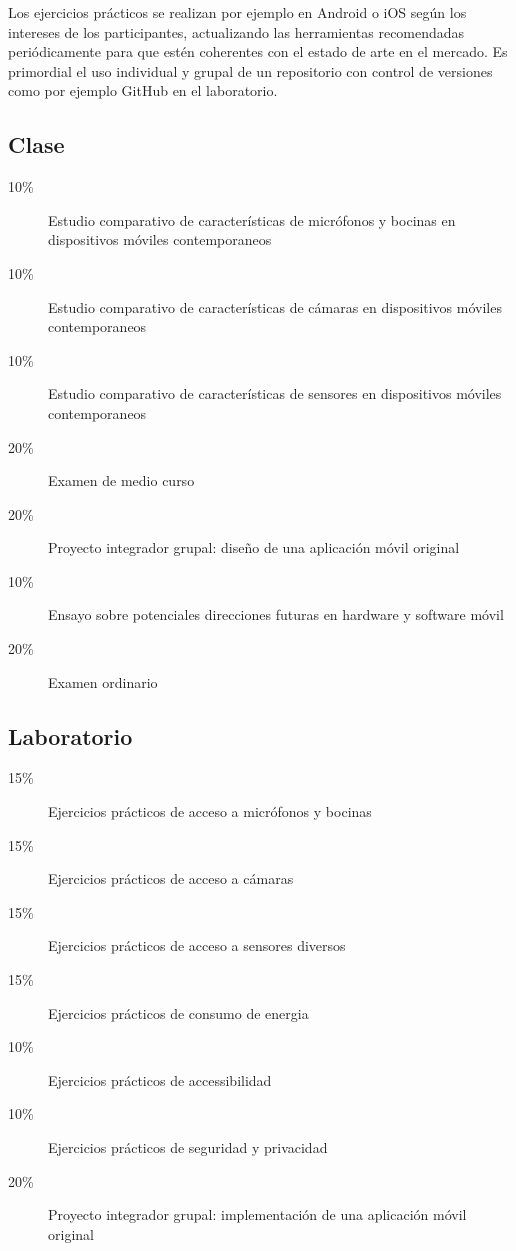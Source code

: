 \documentclass{article}
\begin{document}
\begin{multicols}{4}
Los ejercicios pr\'{a}cticos se realizan por ejemplo en Android o iOS
seg\'{u}n los intereses de los participantes, actualizando las
herramientas recomendadas peri\'{o}dicamente para que est\'{e}n
coherentes con el estado de arte en el mercado. Es primordial el uso
individual y grupal de un repositorio con control de versiones como
por ejemplo GitHub en el laboratorio.

\subsection*{Clase}

\begin{description}
\item[10\%]{Estudio comparativo de caracter\'{i}sticas de micr\'{o}fonos y
  bocinas en dispositivos m\'{o}viles contemporaneos}
\item[10\%]{Estudio comparativo de caracter\'{i}sticas de c\'{a}maras en
  dispositivos m\'{o}viles contemporaneos}
\item[10\%]{Estudio comparativo de caracter\'{i}sticas de sensores en
  dispositivos m\'{o}viles contemporaneos}
\item[20\%]{Examen de medio curso}  
\item[20\%]{Proyecto integrador grupal: dise\~{n}o de una aplicaci\'{o}n
  m\'{o}vil original}
\item[10\%]{Ensayo sobre potenciales direcciones futuras en hardware y
  software m\'{o}vil}
\item[20\%]{Examen ordinario}
\end{description}  

\subsection*{Laboratorio}

\begin{description}
\item[15\%]{Ejercicios pr\'{a}cticos de acceso a micr\'{o}fonos y bocinas}
\item[15\%]{Ejercicios pr\'{a}cticos de acceso a c\'{a}maras}
\item[15\%]{Ejercicios pr\'{a}cticos de acceso a sensores diversos}
\item[15\%]{Ejercicios pr\'{a}cticos de consumo de energia}
\item[10\%]{Ejercicios pr\'{a}cticos de accessibilidad}
\item[10\%]{Ejercicios pr\'{a}cticos de seguridad y privacidad}        
\item[20\%]{Proyecto integrador grupal: implementaci\'{o}n de una aplicaci\'{o}n
  m\'{o}vil original}
\end{description}  


\end{multicols}
\end{document}
